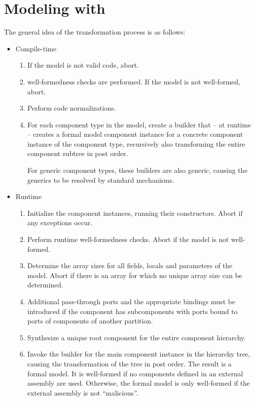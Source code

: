 \documentclass[a4paper,10pt,english]{article}
\begin{document}
\section{Modeling with \SafetySharp}
The general idea of the transformation process is as follows:
\begin{itemize}
	\item Compile-time
	\begin{enumerate}
		\item If the \SSharp model is not valid \CSharp code, abort.
		\item \SSharp well-formedness checks are performed. If the model is not well-formed, abort.
		\item Perform \CSharp code normalizations.
		\item For each component type in the \SSharp model, create a builder that -- at runtime -- creates a formal
		model component instance for a concrete \SSharp component instance of the component type, recursively also transforming the
		entire component subtree in post order. 
		
		For generic component types, these builders are also generic, causing the generics to be resolved by standard \DotNet
		mechanisms.
	\end{enumerate}
	
	\item Runtime
	\begin{enumerate}
		\item Initialize the component instances, running their constructors. Abort if any exceptions occur.
		\item Perform runtime well-formedness checks. Abort if the model is not well-formed.
		\item Determine the array sizes for all fields, locals and parameters of the model. Abort if there is an array for which no
		unique array size can be determined.
		\item Additional pass-through ports and the appropriate bindings must be introduced if the component has subcomponents with ports
		bound to ports of components of another partition.
		\item Synthesize a unique root component for the entire component hierarchy.
		\item Invoke the builder for the main component instance in the hierarchy tree, causing the transformation of the tree in post
		order. The result is a formal model. It is well-formed if no components defined in an external assembly are used. Otherwise, the
		formal model is only well-formed if the external assembly is not ``malicious''.
	\end{enumerate}
\end{itemize}
\end{document}
